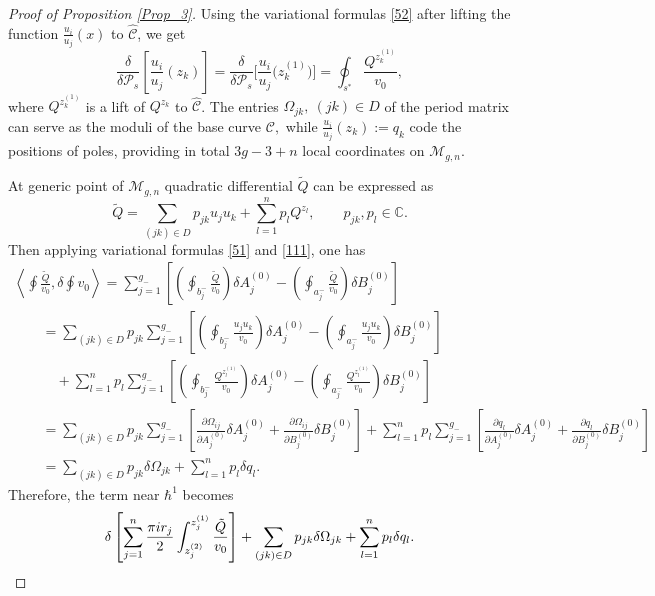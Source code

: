 \documentclass[10pt,a4paper]{article}
\numberwithin{equation}{section}
\theoremstyle{definition}
\newcommand{\CC}{\mathbb{C}}
\begin{document}
\begin{proof}[Proof of Proposition \ref{Prop_3}]
Using the variational formulas \eqref{52} after lifting the function $\frac{u_i}{u_j}(x)$ to $\hat{\mathcal{C}}$, we get
\begin{equation}\label{111}
\frac{\delta }{\delta \mathcal{P}_s}\left[\frac{u_i}{u_j}(z_k)\right]=\frac{\delta }{\delta \mathcal{P}_s}\Bigg[\frac{u_i}{u_j}\big(z^{(1)}_k\big)\Bigg]=\oint_{s^*}\frac{Q^{z^{(1)}_k}}{v_0},
\end{equation}
where $Q^{z^{(1)}_k}$ is a lift of $Q^{z_k}$ to $\hat{\mathcal{C}}$. The entries $\Omega_{jk}, \ (jk) \in D$ of the period matrix can serve as the moduli of the base curve $\mathcal{C},$ while $\frac{u_i}{u_j}(z_k):=q_k$ code the positions of poles, providing in total $3g-3+n$ local coordinates on $\mathcal{M}_{g,n}.$

At generic point of $\mathcal{M}_{g,n}$ quadratic differential $\tilde{Q}$ can be expressed as
\begin{equation*}%
\tilde{Q}=\sum_{(jk) \in D}p_{jk} u_j u_k+ \sum^n_{l=1} p_l Q^{z_l}, \qquad p_{jk}, p_l \in \CC.\end{equation*}
Then applying variational formulas \eqref{51} and \eqref{111}, one has
\begin{gather}
\left\langle \oint \frac{\tilde{Q}}{v_0}, \delta \oint v_0\right\rangle =\sum^{g_-}_{j=1} \left[ \left(\oint_{b^-_j}\frac{\tilde{Q}}{v_0} \right)\delta A^{(0)}_j - \left(\oint_{a^-_j}\frac{\tilde{Q}}{v_0} \right)\delta B^{(0)}_j \right] \nonumber\\
\qquad{}
 =\sum_{(jk) \in D}p_{jk}\sum^{g_-}_{j=1} \left[ \left(\oint_{b^-_j}\frac{u_j u_k}{v_0} \right)
 \delta A^{(0)}_j - \left(\oint_{a^-_j}\frac{u_j u_k}{v_0} \right)\delta B^{(0)}_j \right ]\nonumber\\
 \qquad\quad{} + \sum^n_{l=1} p_l \sum^{g_-}_{j=1} \left[ \left(\oint_{b^-_j}\frac{Q^{z^{(1)}_l}}{v_0} \right)\delta A^{(0)}_j
 - \left(\oint_{a^-_j}\frac{Q^{z^{(1)}_l}}{v_0} \right)\delta B^{(0)}_j \right ]\nonumber\\
\qquad{}
=\sum_{(jk) \in D}\!p_{jk}\sum^{g_-}_{j=1} \!\left[ \frac{\partial \Omega_{ij}}{\partial A^{(0)}_j} \delta A^{(0)}_j +\frac{\partial \Omega_{ij}}{\partial B^{(0)}_j}\delta B^{(0)}_j \right]+\sum^n_{l=1} p_l \sum^{g_-}_{j=1} \!\left[ \frac{\partial q_l}{\partial A^{(0)}_j}\delta A^{(0)}_j + \frac{\partial q_l}{\partial B^{(0)}_j}\delta B^{(0)}_j \right ]
\nonumber\\
\qquad{}
=\sum_{(jk) \in D}p_{jk} \delta \Omega_{jk}+ \sum^n_{l=1} p_l \delta q_l. \label{114}
\end{gather}
Therefore, the term near $\hbar^1$ becomes
\begin{equation}\label{115}\delta\left[\sum^n_{j=1}\frac{\pi {\rm i} r_j}{2}
\int^{z^{(1)}_j}_{z^{(2)}_j}\frac{\tilde{Q}}{v_0} \right]+\sum_{(jk) \in D}p_{jk} \delta \Omega_{jk}+ \sum^n_{l=1} p_l \delta q_l.\end{equation}


\end{proof}
\end{document}
